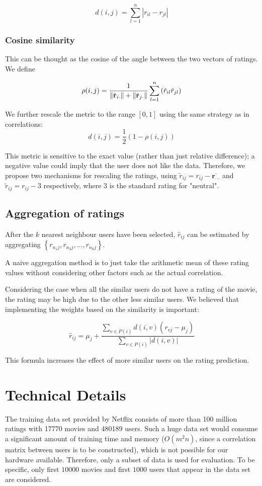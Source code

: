 \documentclass[final]{cvpr}
\newcommand{\Set}[1]{\left\{ #1 \right\}}
\DeclarePairedDelimiter{\norm}{\lVert}{\rVert}
\begin{document}
$$ d(i, j) = \sum_{l=1}^n \left| r_{il} - r_{jl} \right| $$

\subsubsection{Cosine similarity}
This can be thought as the cosine of the angle between the two vectors of ratings.
We define

$$ \rho(i, j) = \frac1{ \norm{\tilde{\mathbf r}_{i\cdot}} + \norm{\tilde{\mathbf r}_{j\cdot}} }
\sum_{l=1}^n \left( \tilde r_{il} \tilde r_{jl} \right) $$

We further rescale the metric to the range $[0, 1]$ using the same strategy as in correlations:
$$ d(i, j) = \frac12 \left(1 - \rho(i, j)\right) $$

This metric is sensitive to the exact value (rather than just relative difference);
a negative value could imply that the user does not like the data.
Therefore, we propose two mechanisms for rescaling the ratings,
using $\tilde r_{ij} = r_{ij} - \overline{\mathbf r_{\cdot\cdot}}$
and $\tilde r_{ij} = r_{ij} - 3$ respectively,
where $3$ is the standard rating for "neutral".

\subsection{Aggregation of ratings}
After the $k$ nearest neighbour users have been selected,
$\hat r_{ij}$ can be estimated by aggregating $\Set{ r_{n_1j}, r_{n_2j}, \ldots, r_{n_kj} }$.

A naive aggregation method is to just take the arithmetic mean of these rating values
without considering other factors such as the actual correlation.

Considering the case when all the similar users do not have a rating of the movie, the rating may be high due to the other less similar users. We believed that implementing the weights based on the similarity is important:

$$ \hat r_{ij} = \mu_j + \frac{\sum_{v \in P(i)} d(i, v) (r_{vj}-\mu_j)}
{\sum_{v \in P(i)} \left| d(i, v) \right|}  $$

This formula increases the effect of more similar users on the rating prediction.

\section{Technical Details}
The training data set provided by Netflix consists of more than 100 million ratings with 17770 movies and 480189 users.
Such a huge data set would consume a significant amount of training time and memory
($O(m^2 n)$, since a correlation matrix between users is to be constructed),
which is not possible for our hardware available.
Therefore, only a subset of data is used for evaluation.
To be specific, only first $10000$ movies and first $1000$ users that appear in the data set are considered.
\end{document}
